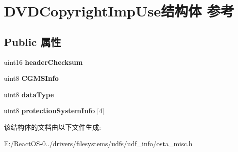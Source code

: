 \hypertarget{struct_d_v_d_copyright_imp_use}{}\section{D\+V\+D\+Copyright\+Imp\+Use结构体 参考}
\label{struct_d_v_d_copyright_imp_use}
\subsection*{Public 属性}
\begin{DoxyCompactItemize}
\item 
\mbox{\label{struct_d_v_d_copyright_imp_use_a594b403f9f1d05013c827063b3c79979}} 
uint16 {\bfseries header\+Checksum}
\item 
\mbox{\label{struct_d_v_d_copyright_imp_use_acc4b4cf62dcf0e3493305ac70bb088d5}} 
uint8 {\bfseries C\+G\+M\+S\+Info}
\item 
\mbox{\label{struct_d_v_d_copyright_imp_use_a13e87cf6a0dd12118be5a74012197df3}} 
uint8 {\bfseries data\+Type}
\item 
\mbox{\label{struct_d_v_d_copyright_imp_use_a56d0a5a458a4341a68f26d78cc3175a2}} 
uint8 {\bfseries protection\+System\+Info} \mbox{[}4\mbox{]}
\end{DoxyCompactItemize}


该结构体的文档由以下文件生成\+:\begin{DoxyCompactItemize}
\item 
E\+:/\+React\+O\+S-\/0../drivers/filesystems/udfs/udf\+\_\+info/osta\+\_\+misc.\+h\end{DoxyCompactItemize}

